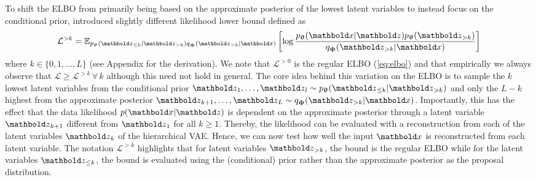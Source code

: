To shift the ELBO from primarily being based on the approximate posterior of the lowest latent variables to instead focus on the conditional prior, \textcite{maaloe_biva_2019} introduced slightly different likelihood lower bound defined as
\begin{equation}\label{eq:biva->k}
    \mathcal{L}^{>k} = \mathbb{E}_{p_\thetab(\zb_{\leq k}|\zb_{>k}) q_\phib(\zb_{>k}|\xb)} \left[ \log \frac{p_\thetab(\xb|\zb)p_\thetab(\zb_{>k})}{q_\phib(\zb_{>k}|\xb)} \right]
\end{equation}
where $k\in\{0,1,\dots,L\}$ (see Appendix for the derivation).
We note that $\mathcal{L}^{>0}$ is the regular ELBO (\cref{eq:elbo}) and that empirically we always observe that $\mathcal{L}\geq\mathcal{L}^{>k} \, \forall \, k$ although this need not hold in general.
The core idea behind this variation on the ELBO is to sample the $k$ lowest latent variables from the conditional prior $\zb_1,\dots,\zb_l \sim p_\thetab(\zb_{\leq k}|\zb_{>k})$ and only the $L-k$ highest from the approximate posterior $\zb_{k+1},\dots,\zb_L \sim q_\phib(\zb_{>k}|\xb)$.
Importantly, this has the effect that the data likelihood $p(\xb|\zb)$ is dependent on the approximate posterior through a latent variable $\zb_{k+1}$ different from $\zb_1$ for all $k \geq 1$.
Thereby, the likelihood can be evaluated with a reconstruction from each of the latent variables $\zb_k$ of the hierarchical VAE.
Hence, we can now test how well the input $\xb$ is reconstructed from each latent variable.
The notation $\mathcal{L}^{>k}$ highlights that for latent variables $\zb_{>k}$, the bound is the regular ELBO while for the latent variables $\zb_{\leq k}$, the bound is evaluated using the (conditional) prior rather than the approximate posterior as the proposal distribution.


